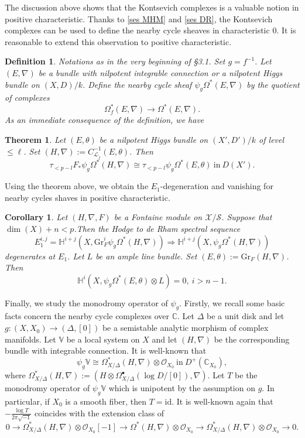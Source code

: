 \documentclass[12pt, a4paper]{article}
\newtheorem{definition}{Definition}[section]
\newtheorem{theorem}{Theorem}[section]
\newtheorem{corollary}{Corollary}[section]
\begin{document}
The discussion above shows that the Kontsevich complexes is a valuable notion in positive characteristic. Thanks to \eqref{ses MHM} and \eqref{ses DR}, the Kontsevich complexes can be used to define the nearby cycle sheaves in characteristic $0$. It is reasonable to extend this observation to positive characteristic.
\begin{definition}
Notations as in the very beginning of \S3.1. Set $g=f^{-1}$. Let $(E,\nabla)$ be a bundle with nilpotent integrable connection or a nilpotent Higgs bundle on $(X,D)/k$. Define the nearby cycle sheaf $\psi_g\Omega^*(E,\nabla)$ by the quotient of complexes
$$
\Omega^*_f(E,\nabla)\to\Omega^*(E,\nabla).
$$
As an immediate consequence of the definition, we have
\end{definition}
\begin{theorem}
Let $(E,\theta)$ be a nilpotent Higgs bundle on $(X',D')/k$ of level $\leq\ell$. Set $(H,\nabla):=C^{-1}_{\mathcal L_{\tilde f}}(E,\theta)$. Then
$$
\tau_{<p-l}F_*\psi_g\Omega^*(H,\nabla)\cong\tau_{<p-l}\psi_g\Omega^*(E,\theta)~\mathrm{in}~D(X').
$$
\end{theorem}
Using the theorem above, we obtain the $E_1$-degeneration and vanishing for nearby cycles shaves in positive characteristic.
\begin{corollary}
Let $(H,\nabla,F)$ be a Fontaine module on $\mathcal X/\mathcal S$. Suppose that $\dim(X)+n<p$.Then the Hodge to de Rham spectral sequence
$$
E_1^{i,j}=\mathbb H^{i+j}(X,\mathrm{Gr}_F^i\psi_g\Omega^*(H,\nabla))\Rightarrow\mathbb H^{i+j}(X,\psi_g\Omega^*(H,\nabla))
$$
degenerates at $E_1$. Let $L$ be an ample line bundle. Set $(E,\theta):=\mathrm{Gr}_F(H,\nabla)$. Then
$$
\mathbb H^i(X,\psi_g\Omega^*(E,\theta)\otimes L)=0,~i>n-1.
$$
\end{corollary}
Finally, we study the monodromy operator of $\psi_g$. Firstly, we recall some basic facts concern the nearby cycle complexes over $\mathbb C$. Let $\Delta$ be a unit disk and let $g:(X,X_0)\to(\Delta,[0])$ be a semistable analytic morphism of complex manifolds. Let $\mathbb V$ be a local system on $X$ and let $(H,\nabla)$ be the corresponding bundle with integrable connection. It is well-known that
$$
\psi_g\mathbb V\cong\Omega^*_{X/\Delta}(H,\nabla)\otimes\mathcal O_{X_0}~\mathrm{in}~D^+(\mathbb C_{X_0}),
$$
where $\Omega^*_{X/\Delta}(H,\nabla):=(H\otimes\Omega^\bullet_{X/\Delta}(\log D/[0]),\nabla)$.
Let $T$ be the monodromy operator of $\psi_g\mathbb V$ which is unipotent by the assumption on $g$. In particular, if $X_0$ is a smooth fiber, then $T=\mathrm{id}$.
It is well-known again that $-\frac{\log T}{2\pi\sqrt{-1}}$ coincides with the extension class of
$$
0\to\Omega_{X/\Delta}^*(H,\nabla)\otimes\mathcal O_{X_0}[-1]\to\Omega^*(H,\nabla)\otimes\mathcal O_{X_0}\to\Omega_{X/\Delta}^*(H,\nabla)\otimes\mathcal O_{X_0}\to0.
$$
\end{document}
